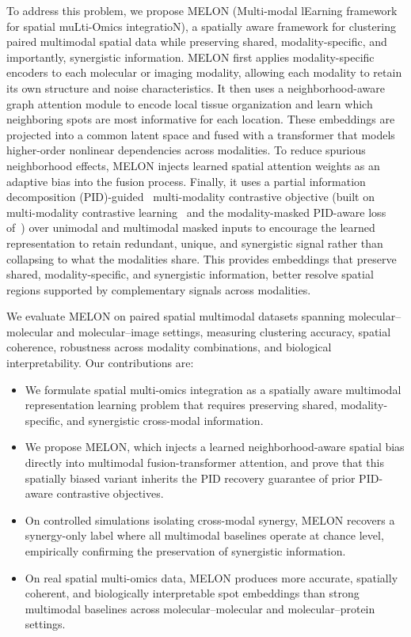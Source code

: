 \documentclass{article}
\theoremstyle{plain}
\theoremstyle{definition}
\begin{document}
To address this problem, we propose MELON (Multi-modal lEarning framework for spatial muLti-Omics integratioN), a spatially aware framework for clustering paired multimodal spatial data while preserving shared, modality-specific, and importantly, synergistic information. MELON first applies modality-specific encoders to each molecular or imaging modality, allowing each modality to retain its own structure and noise characteristics. It then uses a neighborhood-aware graph attention module to encode local tissue organization and learn which neighboring spots are most informative for each location. These embeddings are projected into a common latent space and fused with a transformer that models higher-order nonlinear dependencies across modalities. To reduce spurious neighborhood effects, MELON injects learned spatial attention weights as an adaptive bias into the fusion process. Finally, it uses a partial information decomposition (PID)-guided~\cite{williams2010nonnegative,bertschinger2014quantifying} multi-modality contrastive objective (built on multi-modality contrastive learning~\cite{tian2020contrastive} and the modality-masked PID-aware loss of~\cite{dufumier2024align}) over unimodal and multimodal masked inputs to encourage the learned representation to retain redundant, unique, and synergistic signal rather than collapsing to what the modalities share. This provides embeddings that preserve shared, modality-specific, and synergistic information, better resolve spatial regions supported by complementary signals across modalities.

We evaluate MELON on paired spatial multimodal datasets spanning molecular--molecular and molecular--image settings, measuring clustering accuracy, spatial coherence, robustness across modality combinations, and biological interpretability. Our contributions are:
\begin{itemize}
  \item We formulate spatial multi-omics integration as a spatially aware multimodal representation learning problem that requires preserving shared, modality-specific, and synergistic cross-modal information.
  \item We propose MELON, which injects a learned neighborhood-aware spatial bias directly into multimodal fusion-transformer attention, and prove that this spatially biased variant inherits the PID recovery guarantee of prior PID-aware contrastive objectives.
  \item On controlled simulations isolating cross-modal synergy, MELON recovers a synergy-only label where all multimodal baselines operate at chance level, empirically confirming the preservation of synergistic information.
  \item On real spatial multi-omics data, MELON produces more accurate, spatially coherent, and biologically interpretable spot embeddings than strong multimodal baselines across molecular--molecular and molecular--protein settings.
\end{itemize}
\end{document}
